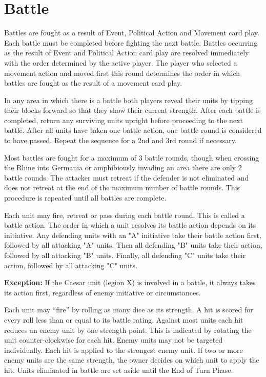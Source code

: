 \section{Battle}
\par
Battles are fought as a result of Event, Political Action and Movement card play. Each battle must be completed before fighting the next battle. Battles occurring as the result of Event and Political Action card play are resolved immediately with the order determined by the active player. The player who selected a movement action and moved first this round determines the order in which battles are fought as the result of a movement card play.

In any area in which there is a battle both players reveal their units by tipping their blocks forward so that they show their current strength. After each battle is completed, return any surviving units upright before proceeding to the next battle. After all units have taken one battle action, one battle round is considered to have passed. Repeat the sequence for a 2nd and 3rd round if necessary.

Most battles are fought for a maximum of 3 battle rounds, though when crossing the Rhine into Germania or amphibiously invading an area there are only 2 battle rounds. The attacker must retreat if the defender is not eliminated and does not retreat at the end of the maximum number of battle rounds. This procedure is repeated until all battles are complete.

Each unit may fire, retreat or pass during each battle round. This is called a battle action. The order in which a unit resolves its battle action depends on its initiative. Any defending units with an "A" initiative take their battle action first, followed by all attacking "A" units. Then all defending "B" units take their action, followed by all attacking "B" units. Finally, all defending "C" units take their action, followed by all attacking "C" units.

\textbf{Exception:} If the Caesar unit (legion X) is involved in a battle, it always takes its action first, regardless of enemy initiative or circumstances.

Each unit may “fire” by rolling as many dice as its strength. A hit is scored for every roll less than or equal to its battle rating. Against most units each hit reduces an enemy unit by one strength point. This is indicated by rotating the unit counter-clockwise for each hit. Enemy units may not be targeted individually. Each hit is applied to the strongest enemy unit. If two or more enemy units are the same strength, the owner decides on which unit to apply the hit. Units eliminated in battle are set aside until the End of Turn Phase.

